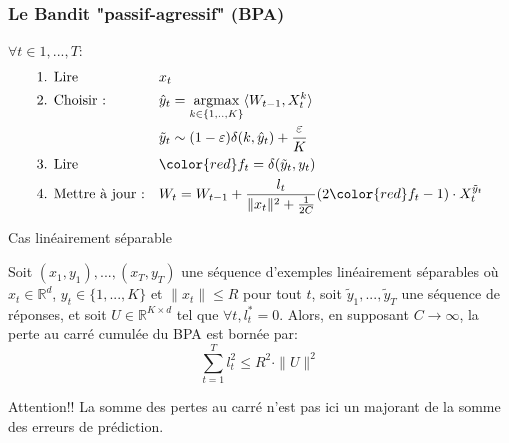 \documentclass{beamer}
\begin{document}
\begin{frame}
	\frametitle{Le Bandit "passif-agressif" (BPA)}
%		
	
	\begin{block}{}
		$\forall t \in 1,...,T :$
		\begin{align*}
		&\text{1. Lire } 
		&& x_t 
		\\
		&\text{2. Choisir :} 
		&& \hat{y}_t = \underset{k \in\{1,..,K\}}{\text{argmax}}  \langle W_{t-1}, X_t^k \rangle 
		\\
		& %
		&& \tilde{y}_t \sim (1-\varepsilon) \delta(k,\hat{y}_t) + \frac{\varepsilon}{K} 
		\\	
		&\text{3. Lire } 
		&& {\color{red} f_t = \delta(\tilde{y}_t ,y_t)}  
		\\
		&\text{4. Mettre à jour :} 
		&& W_t = W_{t-1} + \frac{l_t}{\|x_t\|^2 + \frac{1}{2C}} (2{\color{red}f_t}-1)\cdot X_t^{\tilde{y}_t}
		\end{align*}
	\end{block}
	
\end{frame}

\begin{frame}{Cas linéairement séparable}
	\begin{theorem}
		\label{theo:BPAT1}
		Soit $(x_1,y_1),...,(x_T,y_T)$ une séquence d'exemples linéairement séparables où $x_t \in \mathbb{R}^d$, $y_t\in \{1,...,K\}$ et $\parallel x_t \parallel\leqslant R$ pour tout $t$, soit $\tilde{y}_1,...,\tilde{y}_T$ une séquence de réponses, et soit $U \in \mathbb{R}^{K\times d}$ tel que $ \forall t, l^*_t=0$. Alors, en supposant $C \rightarrow \infty$, la perte au carré cumulée du BPA est bornée par:
		\begin{equation*}
		\sum_{t=1}^{T} l_t^2 \leqslant R^2\cdot \parallel{U}\parallel^2
		\end{equation*}
	\end{theorem}
	
	\begin{alertblock}{Attention!!}
		La somme des pertes au carré n'est pas ici un majorant de la somme des erreurs de prédiction.
	\end{alertblock}
\end{frame}
\end{document}
